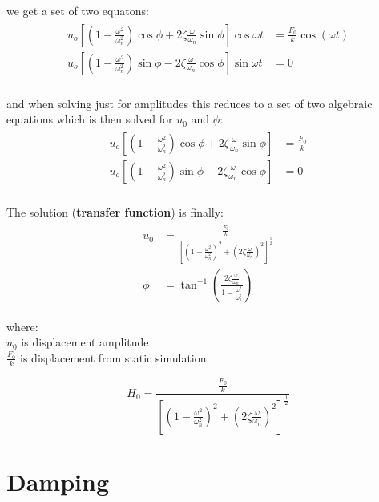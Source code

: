 \documentclass[10pt,b5paper,titlepage]{book}
\newenvironment{eqarray}
{
    \begin{eqnarray}
        \begin{aligned}
}
{
        \end{aligned}
    \end{eqnarray}
}
\begin{document}
we get a set of two equatons:
\begin{eqarray}
    u_o \left[ \left(1 - \frac{\omega^2}{\omega_n^2} \right) \cos{\phi} +
    2 \zeta \frac{\omega}{\omega_n} \sin{\phi} \right] \cos{\omega t}
    &= \frac{F_0}{k} \cos{\left( \omega t \right)}\\
    u_o \left[ \left(1 - \frac{\omega^2}{\omega_n^2} \right) \sin{\phi} -
    2 \zeta \frac{\omega}{\omega_n} \cos{\phi} \right] \sin{\omega t}
    &= 0\\
\end{eqarray}

and when solving just for amplitudes this reduces to a set of two algebraic equations
which is then solved for $ u_0 $ and $ \phi $:
\begin{eqarray}
    u_o \left[ \left(1 - \frac{\omega^2}{\omega_n^2} \right) \cos{\phi} +
    2 \zeta \frac{\omega}{\omega_n} \sin{\phi} \right]
    &= \frac{F_0}{k}\\
    u_o \left[ \left(1 - \frac{\omega^2}{\omega_n^2} \right) \sin{\phi} -
    2 \zeta \frac{\omega}{\omega_n} \cos{\phi} \right]
    &= 0\\
\end{eqarray}

The solution (\textbf{transfer function}) is finally:
\begin{eqarray}
    u_0 &= \frac{\frac{F_0}{k}}{
        \left[
            \left( 1 - \frac{\omega^2}{\omega_n^2} \right)^2 +
            \left( 2 \zeta \frac{\omega}{\omega_n} \right)^2
    \right]^{\frac{1}{2}}}\\
    \phi &= \tan^{-1} \left(
        \frac{2 \zeta \frac{\omega}{\omega_n}}{
    1 - \frac{\omega^2}{\omega_n^2}} \right)
\end{eqarray}

where:\\
$ u_0 $ is displacement amplitude\\
$ \frac{F_0}{k} $ is displacement from static simulation.

\begin{equation}
    H_0 = \frac{\frac{F_0}{k}}{
        \left[
            \left( 1 - \frac{\omega^2}{\omega_n^2} \right)^2 +
            \left( 2 \zeta \frac{\omega}{\omega_n} \right)^2
    \right]^{\frac{1}{2}}}
\end{equation}





\newpage
\section{Damping}
\end{document}
